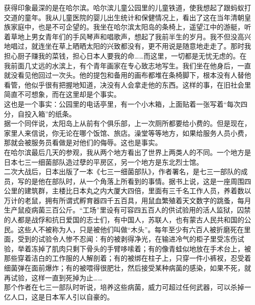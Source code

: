 获得印象最深的是在哈尔滨。哈尔滨儿童公园里的儿童铁道，使我想起了跟蚂蚁打交道的童年。我从儿童医院的婴儿出生统计和保健情况上，看出了这在当年清朝皇族家庭中，也是不可企望的。我坐在哈尔滨太阳岛的条椅上，遥望江中的游艇，听着草地上男女青年们的手风琴声和唱歌声，想起了我前半生的岁月。我不但没高兴地唱过，就连坐在草上晒晒太阳的兴致都没有，更不用说是随意地走走了。那时我担心厨子赚我的菜钱，担心日本人要我的命……而这里，一切都是无忧无虑的。在我前面几丈远的水滨上，有个青年画家在专心致志地写生。我们坐在他身后，一直就没看见他回过一次头。他的提包和备用的画布都堆在条椅脚下，根本没有人替他看管，他似乎很有把握地知道，决没有人会拿走他的东西。这样的事，在旧社会里简直不可想象，而在这里却是个事实。\\

这也是一个事实：公园里的电话亭里，有一个小木箱，上面贴着一张写着“每次四分，自投入箱”的纸条。\\

据一个同伴说，太阳岛上从前有个俱乐部，上一次厕所都要给小费的。但是现在，家里人来信说，你无论在哪个饭馆、旅店。澡堂等等地方，如果给服务人员小费，那就会被服务员看做是对他们的侮辱。这也是事实。\\

在哈尔滨最后几天的参观，我从两个地方看出了世界上两类人的不同。一个地方是日本七三一细菌部队造过孽的平房区，另一个地方是东北烈士馆。\\

二次大战后，日本出版了一本《七三一细菌部队》，作者署名，是七三一部队的成员，写的是他在部队时，从一个角落上所看到的事情。据书上说，这是一座周围四公里的建筑群，主楼比日本丸之内大厦大四倍，里面有三千名工作人员，养着数以万计的老鼠，拥有所谓式孵育器四千五百具，用鼠血繁殖着天文数字的跳蚤，每月生产鼠疫病菌三百公斤。“工场”里设有可容四五百人的供试验用的活人监狱，囚禁的人都是战俘和抗日爱国的志士们，有中国人，苏联人，也有蒙古人民共和国的公民。这些人不被称为人，只是被他们叫做“木头”。每年至少有六百人被折磨死在里面，受到的试验令人惨不忍闻：有的被剥得净光，在输进冷气的柜子里受冻伤试验，举着冻掉了肌肉只剩下骨头的手臂哆嗦着；有的像青蛙似地放在手术台上，被那些穿着洁白的工作服的人解剖着；有的被绑在柱子上，只穿一件小裤衩，忍受着细菌弹在面前爆炸；有的被喂得很肥壮，然后接受某种病菌的感染，如果不死，就再试验，这样一直到死掉为止……\\

那个作者在七三一部队时听说，培养这些病菌，威力可超过任何武器，可以杀掉一亿人口，这是日本军人引以自豪的。\\

